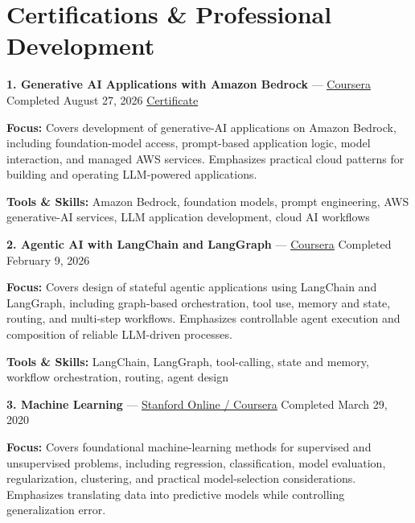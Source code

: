 \documentclass[9pt,letterpaper]{extarticle}
\begin{document}
\section{Certifications \& Professional Development}
\noindent\textbf{1. Generative AI Applications with Amazon Bedrock} {\small --- \textcolor{blue}{\underline{\href{https://www.coursera.org/account/accomplishments/verify/3W16P8EE4BJZ}{Coursera}}} \textbar{} Completed \textbar{} August 27, 2026 \textbar{} \textcolor{blue}{\underline{\href{https://waseemraza844.github.io/portfolio/certificates/genai/aws-bedrock/c2-generative-ai-applications-bedrock.pdf}{Certificate}}}}\par
\textbf{Focus:} Covers development of generative-AI applications on Amazon Bedrock, including foundation-model access, prompt-based application logic, model interaction, and managed AWS services. Emphasizes practical cloud patterns for building and operating LLM-powered applications.\par
{\small\textbf{Tools \& Skills:} Amazon Bedrock, foundation models, prompt engineering, AWS generative-AI services, LLM application development, cloud AI workflows\par}
\vspace{2pt}
\noindent\textbf{2. Agentic AI with LangChain and LangGraph} {\small --- \textcolor{blue}{\underline{\href{https://www.coursera.org/account/accomplishments/verify/L4EY4SLGCPUE}{Coursera}}} \textbar{} Completed \textbar{} February 9, 2026}\par
\textbf{Focus:} Covers design of stateful agentic applications using LangChain and LangGraph, including graph-based orchestration, tool use, memory and state, routing, and multi-step workflows. Emphasizes controllable agent execution and composition of reliable LLM-driven processes.\par
{\small\textbf{Tools \& Skills:} LangChain, LangGraph, tool-calling, state and memory, workflow orchestration, routing, agent design\par}
\vspace{2pt}
\noindent\textbf{3. Machine Learning} {\small --- \textcolor{blue}{\underline{\href{https://www.coursera.org/account/accomplishments/verify/VU3Y5TBLVLZT}{Stanford Online / Coursera}}} \textbar{} Completed \textbar{} March 29, 2020}\par
\textbf{Focus:} Covers foundational machine-learning methods for supervised and unsupervised problems, including regression, classification, model evaluation, regularization, clustering, and practical model-selection considerations. Emphasizes translating data into predictive models while controlling generalization error.\par
\end{document}
